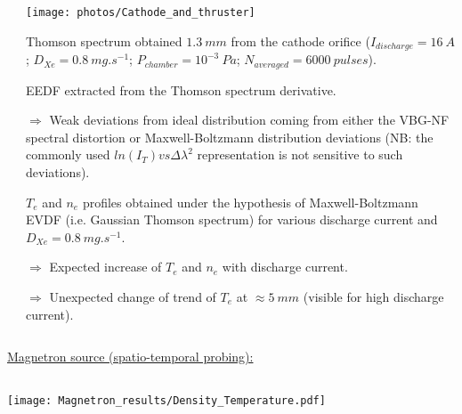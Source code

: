 \documentclass{beamer}
\begin{document}
\begin{frame}[t]
\begin{tcbposter}
{\begin{columns}
\begin{column}[T]{0.25\paperwidth}
   \end{column}
   
   \begin{column}[T]{0.22\paperwidth}
   \vspace{-0.034\paperwidth}%
   \texttt{[image: photos/Cathode\_and\_thruster]} 
   
	\vspace{0.02\paperwidth}%
	  
   Thomson spectrum obtained $1.3 \ mm$ from the cathode orifice ($I_{discharge}=16 \ A $; $D_{Xe}=0.8 \ mg.s^{-1}$; $P_{chamber}=10^{-3} \ Pa$; $N_{averaged} = 6000 \ pulses $). %
   
   \vspace{0.04\paperwidth}%
   
   EEDF extracted from the Thomson spectrum derivative.
   
     $\Rightarrow$ Weak deviations from ideal distribution coming from either the VBG-NF spectral distortion or Maxwell-Boltzmann distribution deviations (NB: the commonly used $ln(I_{T}) vs \Delta \lambda^{2}$ representation is not sensitive to such deviations).
   
\vspace{0.05\paperwidth}%
   
$T_{e}$ and $n_{e}$ profiles obtained under the hypothesis of Maxwell-Boltzmann EVDF (i.e. Gaussian Thomson spectrum) for various discharge current and $D_{Xe} = 0.8 \ mg.s^{-1}$. 
   
   $\Rightarrow$ Expected increase of $T_{e}$ and $n_{e}$ with  discharge current. 
   
   $\Rightarrow$ Unexpected change of trend of $T_{e}$ at $ \approx 5 \ mm$ (visible for high discharge current).
   

   \end{column}
   
\end{columns}


   \tcblower
   \color{beige} 
   \small

   \underline{Magnetron source (spatio-temporal probing):}
   
\begin{columns}
   \begin{column}[T]{0.25\paperwidth}   
   
   \vspace{0.01\paperwidth}  
   
\texttt{[image: Magnetron\_results/Density\_Temperature.pdf]}     
 

\end{column}
\end{columns}}
\end{tcbposter}
\end{frame}
\end{document}
